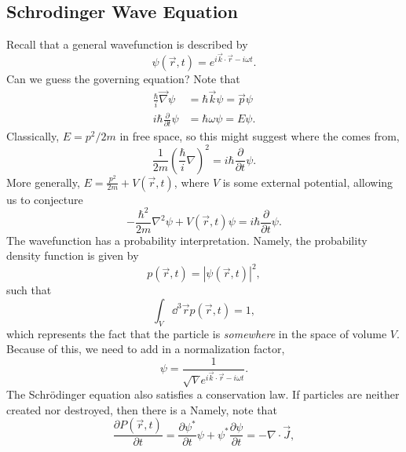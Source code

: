 \documentclass{article}
\numberwithin{equation}{section}
\begin{document}
\subsection{Schrodinger Wave Equation}
Recall that a general wavefunction is described by
\begin{equation*}
    \psi(\vec{r},t) = e^{i\vec{k}\cdot \vec{r} - i\omega t}.
\end{equation*}
Can we guess the governing equation? Note that
\begin{align*}
    \frac{\hbar}{i}\vec{\nabla}\psi &= \hbar \vec{k}\psi = \vec{p}\psi \\ 
    i\hbar \frac{\partial}{\partial t}\psi &= \hbar \omega \psi = E\psi.
\end{align*}
Classically, $E=p^2/2m$ in free space, so this might suggest where the  comes from,
\begin{equation}
    \frac{1}{2m}\left(\frac{\hbar}{i}\nabla\right)^2 = i\hbar\frac{\partial}{\partial t}\psi.
\end{equation}
More generally, $E=\frac{p^2}{2m}+V(\vec{r},t)$, where $V$ is some external potential, allowing us to conjecture
\begin{equation}
    \boxed{-\frac{\hbar^2}{2m}\nabla^2\psi + V(\vec{r},t)\psi = i\hbar\frac{\partial}{\partial t}\psi.}
\end{equation}
The wavefunction has a probability interpretation. Namely, the probability density function is given by 
\begin{equation}
    p(\vec{r},t) = \left|\psi(\vec{r},t)\right|^2,
\end{equation} 
such that
\begin{equation*}
    \int_V \dd^3\vec{r} p(\vec{r},t) = 1,
\end{equation*}
which represents the fact that the particle is \textit{somewhere} in the space of volume $V.$ Because of this, we need to add in a normalization factor, 
\begin{equation*}
    \psi = \frac{1}{\sqrt{V}e^{i\vec{k}\cdot\vec{r} - i\omega t}}.
\end{equation*}
The Schrödinger equation also satisfies a conservation law. If particles are neither created nor destroyed, then there is a  Namely, note that
\begin{equation*}
    \frac{\partial P(\vec{r},t)}{\partial t} = \frac{\partial \psi^*}{\partial t}\psi + \psi^*\frac{\partial \psi}{\partial t} = - \nabla \cdot \vec{J},
\end{equation*}
\end{document}
